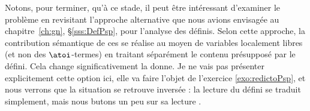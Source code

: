 Notons, pour terminer, qu'à ce stade, il peut être intéressant d'examiner le problème en revisitant l'approche alternative que nous avions envisagée au chapitre~\ref{ch:gn}, \S\ref{sss:DefPsp}, pour l'analyse des {\GN} définis. 
Selon cette approche, la contribution sémantique de ces {\GN} se réalise au moyen de variables localement libres (et non des $\atoi$-termes) en traitant séparément le contenu présupposé par le défini. Cela change significativement la donne. Je ne vais pas présenter explicitement cette option ici, elle va faire l'objet de l'exercice \ref{exo:redictoPsp}, et nous verrons que la situation se retrouve inversée : la lecture  du défini se traduit simplement, mais nous butons un peu sur sa lecture .

\medskip





